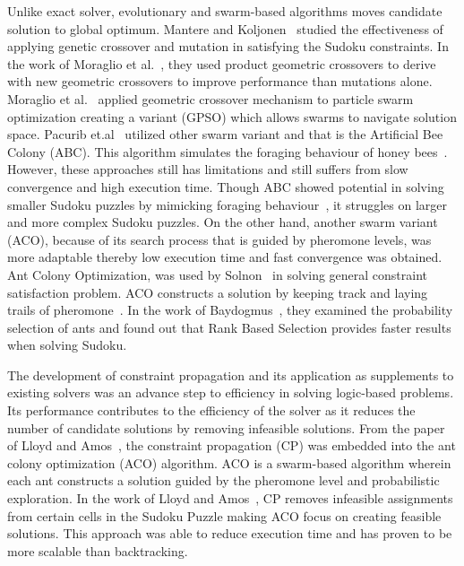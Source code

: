     Unlike exact solver, evolutionary and swarm-based algorithms moves candidate solution to global optimum. Mantere and Koljonen~\cite{mantere2007solving} studied the effectiveness of applying genetic crossover and mutation in satisfying the Sudoku constraints. In the work of Moraglio et al.~\cite{moraglio2006product}, they used product geometric crossovers to derive with new geometric crossovers to improve performance than mutations alone. Moraglio et al.~\cite{GPSO} applied geometric crossover mechanism to particle swarm optimization creating a variant (GPSO) which allows swarms to navigate solution space. Pacurib et.al~\cite{pacurib2009} utilized other swarm variant and that is the Artificial Bee Colony (ABC). This algorithm simulates the foraging behaviour of honey bees~\cite{Kaur}. However, these approaches still has limitations and still suffers from slow convergence and high execution time. Though ABC showed potential in solving smaller Sudoku puzzles by mimicking foraging behaviour~\cite{pacurib2009}, it struggles on larger and more complex Sudoku puzzles. On the other hand, another swarm variant (ACO), because of its search process that is guided by pheromone levels, was more adaptable thereby low execution time and fast convergence was obtained.  Ant Colony Optimization, was used by Solnon~\cite{solnon2002ant} in solving general constraint satisfaction problem. ACO constructs a solution by keeping track and laying trails of pheromone~\cite{solnon2002ant,dorigo2004ant,lloyd2020}. In the work of Baydogmus~\cite{Baydogmus}, they examined the probability selection of ants and found out that Rank Based Selection provides faster results when solving Sudoku. 

    The development of constraint propagation and its application as supplements to existing solvers was an advance step to efficiency in solving logic-based problems. Its performance contributes to the efficiency of the solver as it reduces the number of candidate solutions by removing infeasible solutions. From the paper of Lloyd and Amos~\cite{lloyd2020}, the constraint propagation (CP) was embedded into the ant colony optimization (ACO) algorithm. ACO is a swarm-based algorithm wherein each ant constructs a solution guided by the pheromone level and probabilistic exploration. In the work of Lloyd and Amos~\cite{lloyd2020}, CP removes infeasible assignments from certain cells in the Sudoku Puzzle making ACO focus on creating feasible solutions. This approach was able to reduce execution time and has proven to be more scalable than backtracking. 


